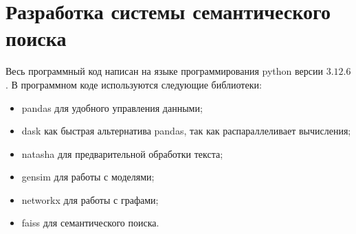 \documentclass[coursework]{SCWorks}
\begin{document}

    
    



\section{Разработка системы семантического поиска}
Весь программный код написан на языке программирования python версии $3.12.6$. В программном коде используются следующие библиотеки:
\begin{itemize}
  \item pandas для удобного управления данными;
  \item dask как быстрая альтернатива pandas, так как распараллеливает вычисления;
  \item natasha для предварительной обработки текста;
  \item gensim для работы с моделями;
  \item networkx для работы с графами;
  \item faiss для семантического поиска.
\end{itemize}
\end{document}
